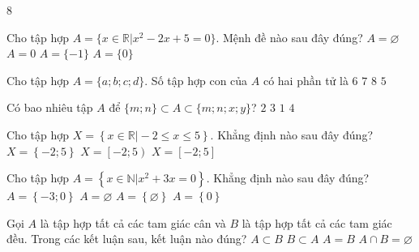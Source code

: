 \begin{indapan}{8}
\begin{ex}%
	Cho tập hợp $A=\{x\in \mathbb{R}|x^2-2x+5=0\}$. Mệnh đề nào sau đây đúng?
	\choice
	{\True $A=\varnothing$}
	{$A=0$}
	{$A=\{-1\}$}
	{$A=\{0\}$}
\end{ex}
\begin{ex}%
	Cho tập hợp $A=\{a;b;c;d\}$. Số tập hợp con của $A$ có hai phần tử là
	\choice
	{\True $6$}
	{$7$}
	{$8$}
	{$5$}
\end{ex}
\begin{ex}%
	Có bao nhiêu tập $A$ để $\{m; n\} \subset A \subset \{m; n; x; y\}$? 
	\choice
	{$2$}
	{$3$}
	{$1$}
	{\True $4$}
\end{ex}
\begin{ex}%
	Cho tập hợp $X = \left\{x \in \mathbb{R}\big|- 2\le x \le 5\right\}$. Khẳng định nào sau đây đúng?
	{$X = \left\{-2;5\right\}$}
	{$X = \left[-2;5\right)$}
	{\True $X = \left[-2;5\right]$}
\end{ex}
\begin{ex}%
	Cho tập hợp $A = \left\{x \in \mathbb{N}\big| x^2 + 3x  = 0\right\}$. Khẳng định nào sau đây đúng?
	\choice
	{$A = \left\{-3;0\right\}$}
	{$A =\varnothing$}
	{$A = \left\{\varnothing\right\}$}
	{\True $ A = \left\{0\right\}$}
\end{ex}
\begin{ex}%
	Gọi $A$ là tập hợp tất cả các tam giác cân và $B$ là tập hợp tất cả các tam giác đều. Trong các kết luận sau, kết luận nào đúng?
	\choice
	{$A \subset B$}
	{\True $B \subset A$}
	{$A=B$}
	{$A \cap B=\varnothing$}
\end{ex}


\end{indapan}

